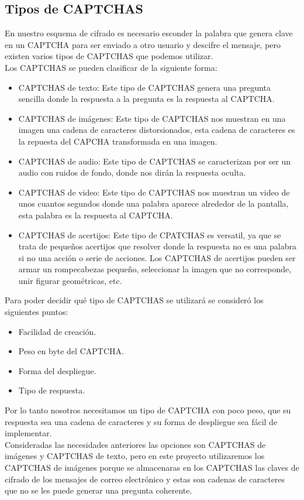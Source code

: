 \documentclass[12pt,oneside,onecolumn,openany]{report}
\begin{document}
\subsection{Tipos de CAPTCHAS}
En nuestro esquema de cifrado es necesario esconder la palabra que genera clave en un CAPTCHA para ser enviado a otro usuario y descifre el mensaje, pero existen varios tipos de CAPTCHAS que podemos utilizar\cite{cit}.\\Los CAPTCHAS se pueden clasificar de la siguiente forma:
\begin{itemize}
 \item CAPTCHAS de texto: Este tipo de CAPTCHAS genera una pregunta sencilla donde la respuesta a la pregunta es la respuesta al CAPTCHA.
 \item CAPTCHAS de imágenes: Este tipo de CAPTCHAS nos muestran en una imagen una cadena de caracteres distorsionados, esta cadena de caracteres es la repuesta del CAPCHA transformada en una imagen.
 \item CAPTCHAS de audio: Este tipo de CAPTCHAS se caracterizan por  ser un audio con ruidos de fondo, donde nos dirán la respuesta oculta.
 \item CAPTCHAS de video: Este tipo de CAPTCHAS nos muestran un video de unos cuantos segundos donde una palabra aparece alrededor de la pantalla, esta palabra es la respuesta al CAPTCHA.
 \item CAPTCHAS de acertijos: Este tipo de CPATCHAS es versatil, ya que se trata de pequeños acertijos que resolver donde la respuesta no es una palabra si no una acción o serie de acciones. Los CAPTCHAS de acertijos pueden ser armar un rompecabezas pequeño, seleccionar la imagen que no corresponde, unir figurar geométricas, etc. 
\end{itemize}
Para poder decidir qué tipo de CAPTCHAS se utilizará se consideró los siguientes puntos:
\begin{itemize}
 \item Facilidad de creación.
 \item Peso en byte del CAPTCHA.
 \item Forma del despliegue.
 \item Tipo de respuesta.
\end{itemize}
Por lo tanto nosotros necesitamos un tipo de CAPTCHA con poco peso, que su respuesta sea una cadena de caracteres y su forma de despliegue sea fácil de implementar. \\
Consideradas las necesidades anteriores las opciones son CAPTCHAS de imágenes y CAPTCHAS de texto, pero en este proyecto utilizaremos los CAPTCHAS de imágenes porque se almacenaras en los CAPTCHAS las claves de cifrado de los mensajes de correo electrónico y estas son cadenas de caracteres que no se les puede generar una pregunta coherente. \\
\end{document}
